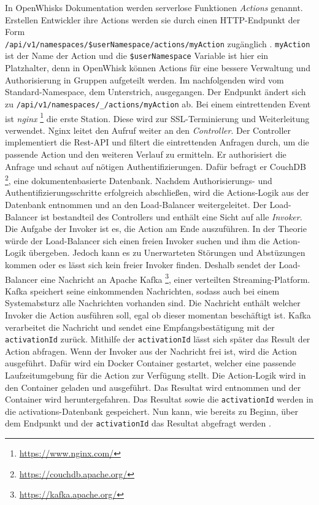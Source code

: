 In OpenWhisks Dokumentation werden serverlose Funktionen
\textit{Actions} genannt. Erstellen Entwickler ihre
Actions werden sie durch einen HTTP-Endpunkt der Form\\
\texttt{/api/v1/namespaces/\$userNamespace/actions/myAction} zugänglich
\cite{OpenWhiskGithub}. \texttt{myAction} ist der Name der Action
und die \texttt{\$userNamespace} Variable ist hier ein
Platzhalter, denn in OpenWhisk können Actions für eine bessere
Verwaltung und Authorisierung in Gruppen aufgeteilt werden.
Im nachfolgenden wird vom Standard-Namespace, dem Unterstrich,
ausgegangen. Der Endpunkt ändert sich zu
\texttt{/api/v1/namespaces/\_/actions/myAction} ab.
Bei einem eintrettenden Event ist \textit{nginx}
\footnote{\url{https://www.nginx.com/}} die erste Station.
Diese wird zur SSL-Terminierung und Weiterleitung verwendet.
Nginx leitet den Aufruf weiter an den \textit{Controller}.
Der Controller implementiert die Rest-API und filtert die
eintrettenden Anfragen durch, um die passende Action und
den weiteren Verlauf zu ermitteln.
Er authorisiert die Anfrage und schaut auf nötigen Authentifizierungen.
Dafür befragt er CouchDB \footnote{\url{https://couchdb.apache.org/}},
eine dokumentenbasierte Datenbank. Nachdem Authorisierungs-
und Authentifizierungsschritte erfolgreich abschließen,
wird die Actions-Logik aus der Datenbank entnommen und an den
Load-Balancer weitergeleitet. Der Load-Balancer ist bestandteil
des Controllers und enthält eine Sicht auf alle \textit{Invoker}.
Die Aufgabe der Invoker ist es, die Action am Ende auszuführen.
In der Theorie würde der Load-Balancer sich einen freien Invoker suchen
und ihm die Action-Logik übergeben. Jedoch kann es zu Unerwarteten
Störungen und Abstüzungen kommen oder es lässt sich kein freier
Invoker finden. Deshalb sendet der Load-Balancer eine Nachricht an
Apache Kafka \footnote{\url{https://kafka.apache.org/}},
einer verteilten Streaming-Platform. Kafka speichert seine
einkommenden Nachrichten, sodass auch bei einem Systemabsturz alle
Nachrichten vorhanden sind. Die Nachricht enthält welcher
Invoker die Action ausführen soll, egal ob dieser momentan
beschäftigt ist. Kafka verarbeitet die Nachricht und sendet eine
Empfangsbestätigung mit der \texttt{activationId} zurück. Mithilfe
der \texttt{activationId} lässt sich später das Result der Action
abfragen. Wenn der Invoker aus der Nachricht frei ist, wird die
Action ausgeführt. Dafür wird ein Docker Container gestartet,
welcher eine passende Laufzeitumgebung für die Action zur Verfügung
stellt. Die Action-Logik wird in den Container geladen und ausgeführt.
Das Resultat wird entnommen und der Container wird heruntergefahren.
Das Resultat sowie die \texttt{activationId} werden in die
activations-Datenbank gespeichert. Nun kann, wie bereits zu Beginn,
über dem Endpunkt und der \texttt{activationId} das Resultat abgefragt
werden \cite{OpenWhiskGithub}.


